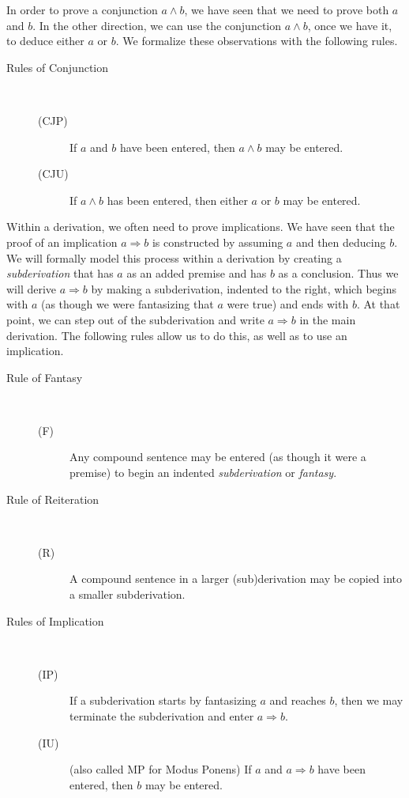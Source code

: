 \documentclass{article}
\newcommand{\0}{\mathbf 0}
\newcommand{\1}{\mathbf 1}
\begin{document}
In order to prove a conjunction $a \land b$, we have seen that we need to prove both $a$ and $b$. In the other direction, we can use the conjunction $a \land b$, once we have it, to deduce either $a$ or $b$. We formalize these observations with the following rules.

\begin{description}
  \item[Rules of Conjunction] $\ $
    \begin{description}
      \item[(CJP)] If $a$ and $b$ have been entered, then $a \land b$ may be entered.
      \item[(CJU)] If $a \land b$ has been entered, then either $a$ or $b$ may be entered.
    \end{description}
\end{description}

Within a derivation, we often need to prove implications. We have seen that the proof of an implication $a \Rightarrow b$ is constructed by assuming $a$ and then deducing $b$. We will formally model this process within a derivation by creating a \emph{subderivation} that has $a$ as an added premise and has $b$ as a conclusion. Thus we will derive $a \Rightarrow b$ by making a subderivation, indented to the right, which begins with $a$ (as though we were fantasizing that $a$ were true) and ends with $b$. At that point, we can step out of the subderivation and write $a \Rightarrow b$ in the main derivation. The following rules allow us to do this, as well as to use an implication.

\begin{description}
  \item[Rule of Fantasy] $\ $
    \begin{description}
      \item[(F)] Any compound sentence may be entered (as though it were a premise) to begin an indented \emph{subderivation} or \emph{fantasy}.
    \end{description}

  \item[Rule of Reiteration] $\ $
    \begin{description}
      \item[(R)] A compound sentence in a larger (sub)derivation may be copied into a smaller subderivation.
    \end{description}

  \item[Rules of Implication] $\ $
    \begin{description}
      \item[(IP)] If a subderivation starts by fantasizing $a$ and reaches $b$, then we may terminate the subderivation and enter $a \Rightarrow b$.
      \item[(IU)] (also called MP for Modus Ponens) If $a$ and $a \Rightarrow b$ have been entered, then $b$ may be entered.
    \end{description}
\end{description}
\end{document}
